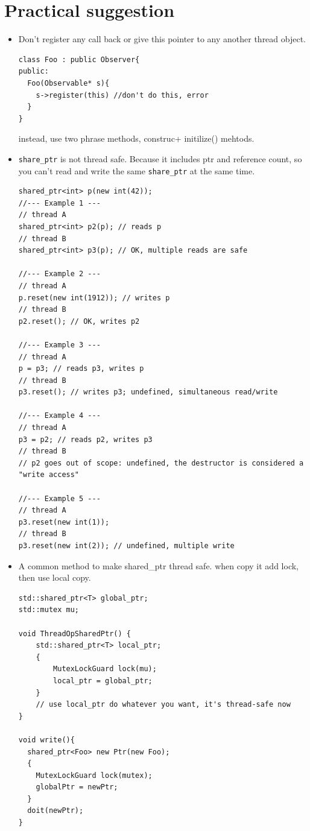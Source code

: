\documentclass[a4paper,11pt,twoside]{book}
\begin{document}
\section{Practical suggestion}
\begin{itemize}

	\item Don't register any call back or give this pointer to any another thread object.
\begin{lstlisting}
class Foo : public Observer{
public:
  Foo(Observable* s){
    s->register(this) //don't do this, error
  }
}
\end{lstlisting}
instead, use two phrase methods, construc+ initilize() mehtods.

    \item \texttt{share\_ptr} is not thread safe. Because it includes ptr and reference count, so you can't read and write the same \texttt{share\_ptr} at the same time. 

\begin{lstlisting}
shared_ptr<int> p(new int(42));
//--- Example 1 ---
// thread A
shared_ptr<int> p2(p); // reads p
// thread B
shared_ptr<int> p3(p); // OK, multiple reads are safe

//--- Example 2 ---
// thread A
p.reset(new int(1912)); // writes p
// thread B
p2.reset(); // OK, writes p2

//--- Example 3 ---
// thread A
p = p3; // reads p3, writes p
// thread B
p3.reset(); // writes p3; undefined, simultaneous read/write

//--- Example 4 ---
// thread A
p3 = p2; // reads p2, writes p3
// thread B
// p2 goes out of scope: undefined, the destructor is considered a "write access"

//--- Example 5 ---
// thread A
p3.reset(new int(1));
// thread B
p3.reset(new int(2)); // undefined, multiple write
\end{lstlisting}

		\item A common method to make shared\_ptr thread safe. when copy it add lock, then use local copy.
\begin{lstlisting}
std::shared_ptr<T> global_ptr;
std::mutex mu;

void ThreadOpSharedPtr() {
    std::shared_ptr<T> local_ptr;
    {
        MutexLockGuard lock(mu);
        local_ptr = global_ptr;
    }
    // use local_ptr do whatever you want, it's thread-safe now
}

void write(){
  shared_ptr<Foo> new Ptr(new Foo);
  {
    MutexLockGuard lock(mutex);
	globalPtr = newPtr;
  }
  doit(newPtr);
}
\end{lstlisting}


\end{itemize}
\end{document}
